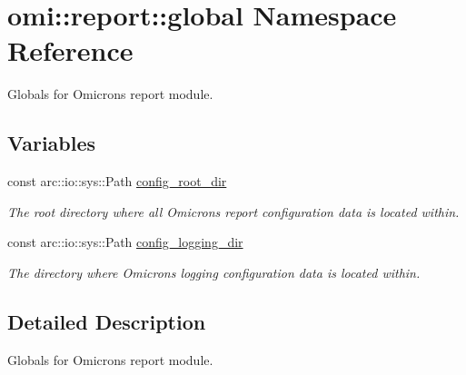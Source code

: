 \hypertarget{namespaceomi_1_1report_1_1global}{}\section{omi\+:\+:report\+:\+:global Namespace Reference}
\label{namespaceomi_1_1report_1_1global}


Globals for Omicron\textquotesingle{}s report module.  


\subsection*{Variables}
\begin{DoxyCompactItemize}
\item 
const arc\+::io\+::sys\+::\+Path \hyperlink{namespaceomi_1_1report_1_1global_ad36ec5a81ec6a2679f38edff8ef31d9e}{config\+\_\+root\+\_\+dir}\hypertarget{namespaceomi_1_1report_1_1global_ad36ec5a81ec6a2679f38edff8ef31d9e}{}\label{namespaceomi_1_1report_1_1global_ad36ec5a81ec6a2679f38edff8ef31d9e}

\begin{DoxyCompactList}\small\item\em The root directory where all Omicron\textquotesingle{}s report configuration data is located within. \end{DoxyCompactList}\item 
const arc\+::io\+::sys\+::\+Path \hyperlink{namespaceomi_1_1report_1_1global_a994f26dcbffa9c6116621071d7425360}{config\+\_\+logging\+\_\+dir}\hypertarget{namespaceomi_1_1report_1_1global_a994f26dcbffa9c6116621071d7425360}{}\label{namespaceomi_1_1report_1_1global_a994f26dcbffa9c6116621071d7425360}

\begin{DoxyCompactList}\small\item\em The directory where Omicron\textquotesingle{}s logging configuration data is located within. \end{DoxyCompactList}\end{DoxyCompactItemize}


\subsection{Detailed Description}
Globals for Omicron\textquotesingle{}s report module. 